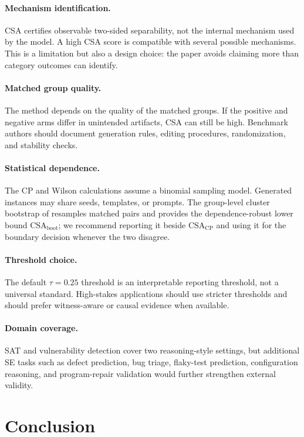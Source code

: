 \documentclass[10pt,conference]{IEEEtran}
\theoremstyle{remark}
\newcommand{\CSACP}{\mathrm{CSA}_{\mathrm{CP}}}
\newcommand{\CSAboot}{\mathrm{CSA}_{\mathrm{boot}}}
\begin{document}
\paragraph{Mechanism identification.}
CSA certifies observable two-sided separability, not the internal mechanism used by the model.  A high CSA score is compatible with several possible mechanisms.  This is a limitation but also a design choice: the paper avoids claiming more than category outcomes can identify.

\paragraph{Matched group quality.}
The method depends on the quality of the matched groups.  If the positive and negative arms differ in unintended artifacts, CSA can still be high.  Benchmark authors should document generation rules, editing procedures, randomization, and stability checks.

\paragraph{Statistical dependence.}
The CP and Wilson calculations assume a binomial sampling model.  Generated instances may share seeds, templates, or prompts.  The group-level cluster bootstrap of  resamples matched pairs and provides the dependence-robust lower bound $\CSAboot$; we recommend reporting it beside $\CSACP$ and using it for the boundary decision whenever the two disagree.

\paragraph{Threshold choice.}
The default $\tau=0.25$ threshold is an interpretable reporting threshold, not a universal standard.  High-stakes applications should use stricter thresholds and should prefer witness-aware or causal evidence when available.

\paragraph{Domain coverage.}
SAT and vulnerability detection cover two reasoning-style settings, but additional SE tasks such as defect prediction, bug triage, flaky-test prediction, configuration reasoning, and program-repair validation would further strengthen external validity.

\section{Conclusion}
\end{document}

